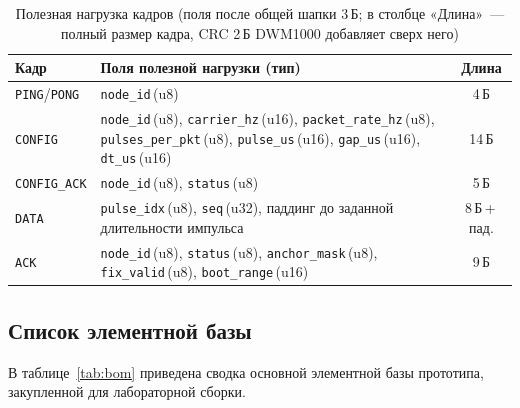 \documentclass[a4paper,11pt]{article} %
\begin{document}
\begin{table}[h!]
\centering
\caption{Полезная нагрузка кадров (поля после общей шапки 3\,Б; в столбце «Длина»~--- полный
размер кадра, CRC 2\,Б DWM1000 добавляет сверх него)}
\label{tab:uwb-frames}
\small
\begin{tabular}{@{}l p{8.4cm} c@{}}
\toprule
Кадр & Поля полезной нагрузки (тип) & Длина \\ \midrule
\texttt{PING}/\texttt{PONG} & \texttt{node\_id}\,(u8) & 4\,Б \\
\texttt{CONFIG} & \texttt{node\_id}\,(u8), \texttt{carrier\_hz}\,(u16), \texttt{packet\_rate\_hz}\,(u8), \texttt{pulses\_per\_pkt}\,(u8), \texttt{pulse\_us}\,(u16), \texttt{gap\_us}\,(u16), \texttt{dt\_us}\,(u16) & 14\,Б \\
\texttt{CONFIG\_ACK} & \texttt{node\_id}\,(u8), \texttt{status}\,(u8) & 5\,Б \\
\texttt{DATA} & \texttt{pulse\_idx}\,(u8), \texttt{seq}\,(u32), паддинг до заданной длительности импульса & 8\,Б\,+\,пад. \\
\texttt{ACK} & \texttt{node\_id}\,(u8), \texttt{status}\,(u8), \texttt{anchor\_mask}\,(u8), \texttt{fix\_valid}\,(u8), \texttt{boot\_range}\,(u16) & 9\,Б \\
\bottomrule
\end{tabular}
\end{table}

\FloatBarrier

\subsection{Список элементной базы}
\label{sec:bom}

В таблице~\ref{tab:bom} приведена сводка основной элементной базы прототипа,
закупленной для лабораторной сборки.
\end{document}
